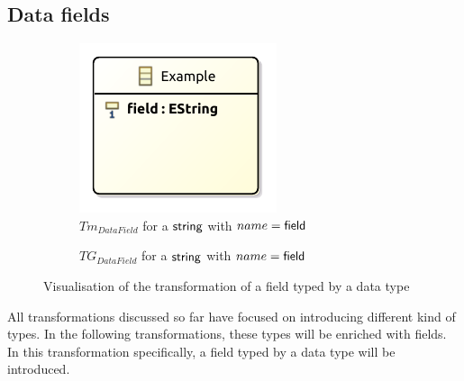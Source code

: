 \subsection{Data fields}
\label{subsec:library_of_transformations:type_level_transformations:data_fields}

\begin{figure}
    \centering
    \begin{subfigure}{0.45\textwidth}
        \centering
        \includegraphics{images/05_library_of_transformations/02_type_level_transformations/06_data_fields/data_field.pdf}
        \caption{$Tm_{DataField}$ for a $\mathsf{string}$ with $name = \mathsf{field}$}
        \label{fig:library_of_transformations:type_level_transformations:data_fields:visualisation:ecore}
    \end{subfigure}
    \begin{subfigure}{0.45\textwidth}
        \centering
        
        \caption{$TG_{DataField}$ for a $\mathsf{string}$ with $name = \mathsf{field}$}
        \label{fig:library_of_transformations:type_level_transformations:data_fields:visualisation:groove}
    \end{subfigure}
    \caption{Visualisation of the transformation of a field typed by a data type}
    \label{fig:library_of_transformations:type_level_transformations:data_fields:visualisation}
\end{figure}

All transformations discussed so far have focused on introducing different kind of types. In the following transformations, these types will be enriched with fields. In this transformation specifically, a field typed by a data type will be introduced.

